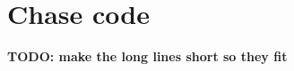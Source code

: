 \section{Chase code}
\label{sec:appendix_chase}

	\textbf{TODO: make the long lines short so they fit}
	{\scriptsize
		\lstset{
			language=Haskell,
			numbers=left,
			columns=fixed,
			tabsize=3,
		}
		
	}
